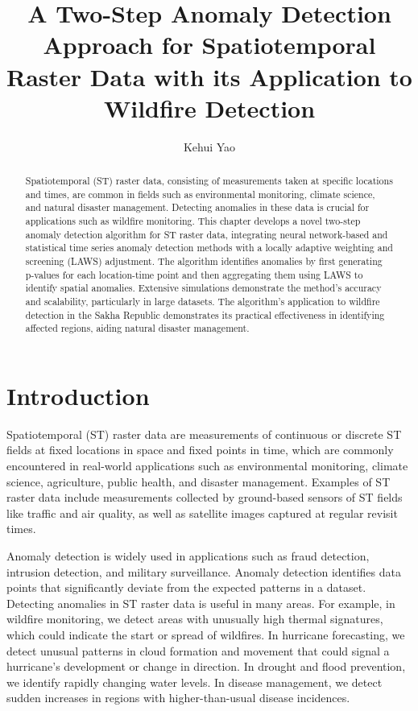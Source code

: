 \documentclass[11pt]{article}
\title{A Two-Step Anomaly Detection Approach for Spatiotemporal Raster Data with its Application to Wildfire Detection}
\author[1]{Kehui Yao}
\affil[1]{Department of Statistics, University of Wisconsin-Madison}
\date{}
\begin{document}
\maketitle

\begin{abstract}
Spatiotemporal (ST) raster data, consisting of measurements taken at specific locations and times, are common in fields such as environmental monitoring, climate science, and natural disaster management. Detecting anomalies in these data is crucial for applications such as wildfire monitoring. This chapter develops a novel two-step anomaly detection algorithm for ST raster data, integrating neural network-based and statistical time series anomaly detection methods with a locally adaptive weighting and screening (LAWS) adjustment. The algorithm identifies anomalies by first generating p-values for each location-time point and then aggregating them using LAWS to identify spatial anomalies. Extensive simulations demonstrate the method's accuracy and scalability, particularly in large datasets. The algorithm's application to wildfire detection in the Sakha Republic demonstrates its practical effectiveness in identifying affected regions, aiding natural disaster management.

\end{abstract}

\section{Introduction}
Spatiotemporal (ST) raster data are measurements of continuous or discrete ST fields at fixed locations in space and fixed points in time, which are commonly encountered in real-world applications such as environmental monitoring, climate science, agriculture, public health, and disaster management. Examples of ST raster data include measurements collected by ground-based sensors of ST fields like traffic and air quality, as well as satellite images captured at regular revisit times. 
 
 Anomaly detection is widely used in applications such as fraud detection, intrusion detection, and military surveillance. Anomaly detection identifies data points that significantly deviate from the expected patterns in a dataset.  Detecting anomalies in ST raster data is useful in many areas. For example, in wildfire monitoring, we detect areas with unusually high thermal signatures, which could indicate the start or spread of wildfires. In hurricane forecasting, we detect unusual patterns in cloud formation and movement that could signal a hurricane's development or change in direction. In drought and flood prevention, we identify rapidly changing water levels. In disease management, we detect sudden increases in regions with higher-than-usual disease incidences.
\end{document}

